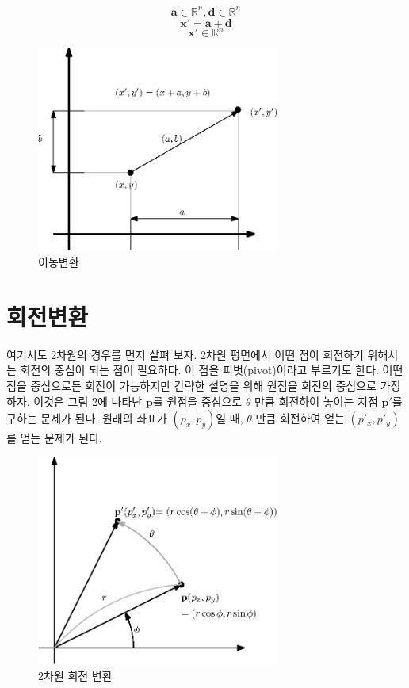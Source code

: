 $$\mathbf a \in \mathbb R^n, \mathbf d \in \mathbb R^n$$
$$\mathbf x' = \mathbf a + \mathbf d$$
$$\mathbf x' \in \mathbb R^n$$

\begin{figure}[h!]
  \centering
    \includegraphics[width=8cm]{Math_transform/translation.eps}
    \caption{이동변환}
    \label{fig:transform:translation}
\end{figure}

\section{회전변환}


여기서도 2차원의 경우를 먼저 살펴 보자.
2차원 평면에서 어떤 점이 회전하기 위해서는 회전의 중심이 되는 점이 필요하다. 이 점을 피벗(pivot)이라고 부르기도 한다.
어떤 점을 중심으로든 회전이 가능하지만 간략한 설명을 위해 원점을 회전의 중심으로 가정하자.
이것은 그림 \ref{fig:transform:rotation}에 나타난 $\mathbf p$를 원점을 중심으로 $\theta$ 만큼 회전하여 놓이는 지점 $\mathbf p'$를 구하는 문제가 된다.
원래의 좌표가 $(p_x,p_y)$일 때, $\theta$ 만큼 회전하여 얻는 $(p'_x, p'_y)$를 얻는 문제가 된다.

\begin{figure}[h!]
  \centering
    \includegraphics[width=8cm]{Math_transform/rotation.eps}
    \caption{2차원 회전 변환}
    \label{fig:transform:rotation}
\end{figure}

